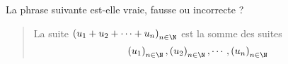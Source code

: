 La phrase suivante est-elle vraie, fausse ou incorrecte ?
\begin{quote}
 La suite $\left(u_1+u_2+\cdots +u_n \right)_{n\in\N}$ est la somme des suites 
\[\left(u_1 \right)_{n\in\N}
, \left(u_2 \right)_{n\in\N}, \cdots, \left(u_n \right)_{n\in\N}\]
\end{quote}
